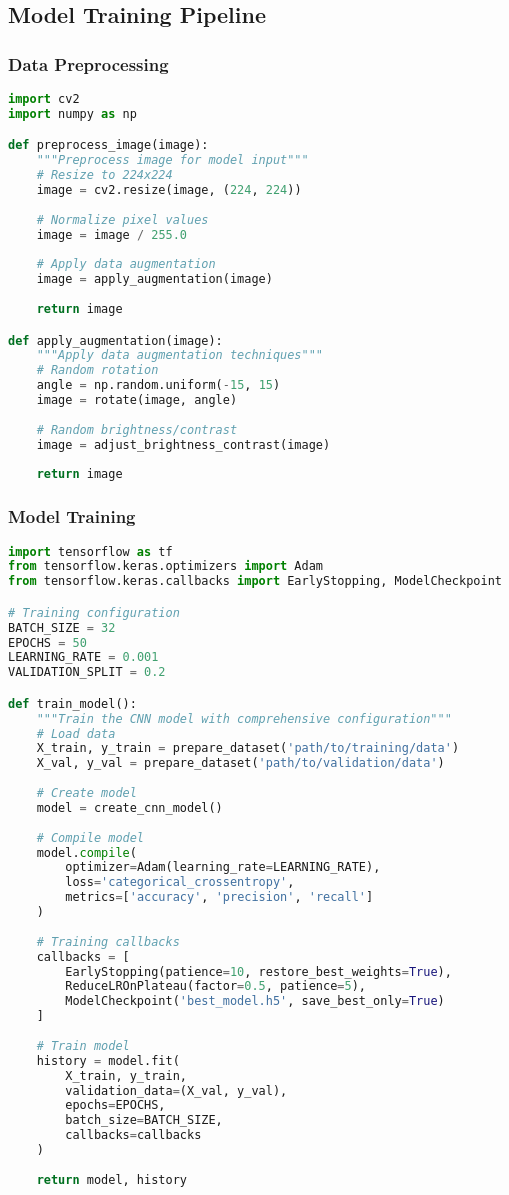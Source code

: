 \documentclass[12pt,a4paper]{article}
\begin{document}
\subsection{Model Training Pipeline}

\subsubsection{Data Preprocessing}
\begin{lstlisting}[language=Python, caption=Image Preprocessing Pipeline]
import cv2
import numpy as np

def preprocess_image(image):
    """Preprocess image for model input"""
    # Resize to 224x224
    image = cv2.resize(image, (224, 224))
    
    # Normalize pixel values
    image = image / 255.0
    
    # Apply data augmentation
    image = apply_augmentation(image)
    
    return image

def apply_augmentation(image):
    """Apply data augmentation techniques"""
    # Random rotation
    angle = np.random.uniform(-15, 15)
    image = rotate(image, angle)
    
    # Random brightness/contrast
    image = adjust_brightness_contrast(image)
    
    return image
\end{lstlisting}

\subsubsection{Model Training}
\begin{lstlisting}[language=Python, caption=Model Training Configuration]
import tensorflow as tf
from tensorflow.keras.optimizers import Adam
from tensorflow.keras.callbacks import EarlyStopping, ModelCheckpoint

# Training configuration
BATCH_SIZE = 32
EPOCHS = 50
LEARNING_RATE = 0.001
VALIDATION_SPLIT = 0.2

def train_model():
    """Train the CNN model with comprehensive configuration"""
    # Load data
    X_train, y_train = prepare_dataset('path/to/training/data')
    X_val, y_val = prepare_dataset('path/to/validation/data')
    
    # Create model
    model = create_cnn_model()
    
    # Compile model
    model.compile(
        optimizer=Adam(learning_rate=LEARNING_RATE),
        loss='categorical_crossentropy',
        metrics=['accuracy', 'precision', 'recall']
    )
    
    # Training callbacks
    callbacks = [
        EarlyStopping(patience=10, restore_best_weights=True),
        ReduceLROnPlateau(factor=0.5, patience=5),
        ModelCheckpoint('best_model.h5', save_best_only=True)
    ]
    
    # Train model
    history = model.fit(
        X_train, y_train,
        validation_data=(X_val, y_val),
        epochs=EPOCHS,
        batch_size=BATCH_SIZE,
        callbacks=callbacks
    )
    
    return model, history
\end{lstlisting}
\end{document}
